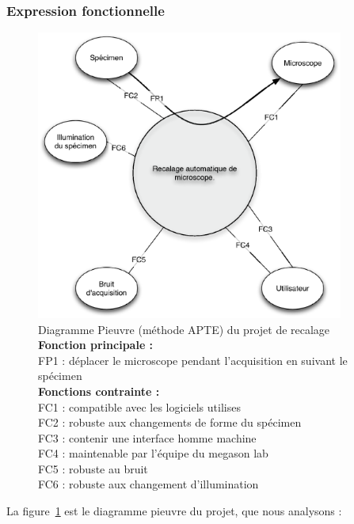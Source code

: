 \subsubsection{Expression fonctionnelle}

\begin{figure}[H]
\begin{center}
\includegraphics[width=0.9\textwidth]{pictures/RecalPIEUVRE}
\end{center}
\caption[Diagramme Pieuvre (méthode {APTE\textregistered}) du projet de recalage]{Diagramme Pieuvre (méthode {APTE\textregistered}) du projet de recalage
\small
\textbf{Fonction principale :}\\
FP1 : déplacer le microscope pendant l'acquisition en suivant le spécimen\\
\textbf{Fonctions contrainte :} \\
FC1 : compatible avec les logiciels utilises\\
FC2 : robuste aux changements de forme du spécimen\\
FC3 : contenir une interface homme machine\\
FC4 : maintenable par l'équipe du megason lab\\
FC5 : robuste au bruit\\
FC6 : robuste aux changement d'illumination}
\label{fig:PIEUVRERecal}
\end{figure}

La figure~\ref{fig:PIEUVRERecal} est le diagramme pieuvre du projet, que nous analysons :
